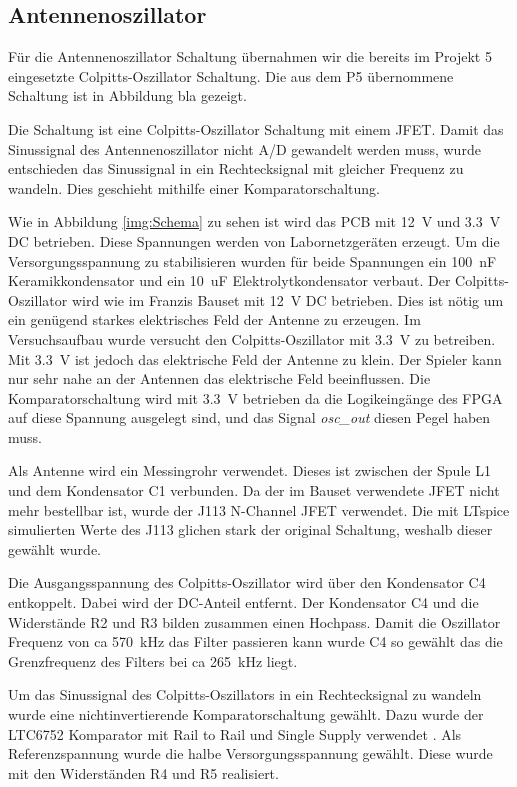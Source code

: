\subsection{Antennenoszillator}\label{subsec:Antennenoszilator}
Für die Antennenoszillator Schaltung übernahmen wir die bereits im Projekt 5 eingesetzte Colpitts-Oszillator Schaltung. Die aus dem P5 übernommene Schaltung ist in Abbildung bla  gezeigt. 

Die Schaltung ist eine Colpitts-Oszillator Schaltung mit einem JFET. 
Damit das Sinussignal des Antennenoszillator nicht A/D gewandelt werden muss, wurde entschieden das Sinussignal in ein Rechtecksignal mit gleicher Frequenz zu wandeln. Dies geschieht mithilfe einer Komparatorschaltung. 

Wie in Abbildung \ref{img:Schema} zu sehen ist wird das PCB mit \SI{12}{V} und \SI{3.3}{V} DC betrieben. Diese Spannungen werden von Labornetzgeräten erzeugt. Um die Versorgungsspannung zu stabilisieren wurden für beide Spannungen ein  \SI{100}{nF} Keramikkondensator und ein \SI{10}{uF} Elektrolytkondensator verbaut. 
Der Colpitts-Oszillator wird wie im Franzis Bauset mit \SI{12}{V} DC betrieben. Dies ist nötig um ein genügend starkes elektrisches Feld der Antenne zu erzeugen. Im Versuchsaufbau wurde versucht den Colpitts-Oszillator mit \SI{3.3}{V} zu betreiben. Mit \SI{3.3}{V} ist jedoch das elektrische Feld der Antenne zu klein. Der Spieler kann nur sehr nahe an der Antennen das elektrische Feld beeinflussen.
Die Komparatorschaltung wird mit \SI{3.3}{V} betrieben da die Logikeingänge des FPGA auf diese Spannung ausgelegt sind, und das Signal \textit{osc\_out} diesen Pegel haben muss.

Als Antenne wird ein Messingrohr verwendet. Dieses ist zwischen der Spule L1 und dem Kondensator C1 verbunden. 
Da der im Bauset verwendete JFET nicht mehr bestellbar ist, wurde der J113 N-Channel JFET verwendet. Die mit LTspice simulierten Werte des J113 glichen stark der original Schaltung, weshalb dieser gewählt wurde. 



\clearpage

Die Ausgangsspannung des Colpitts-Oszillator wird über den Kondensator C4 entkoppelt. Dabei wird der DC-Anteil entfernt. Der Kondensator C4 und die Widerstände R2 und R3 bilden zusammen einen Hochpass. Damit die Oszillator Frequenz von ca \SI{570}{kHz} das Filter passieren kann wurde C4 so gewählt das die Grenzfrequenz des Filters bei ca \SI{265}{kHz} liegt. 

Um das Sinussignal des Colpitts-Oszillators in ein Rechtecksignal zu wandeln wurde eine nichtinvertierende Komparatorschaltung gewählt. Dazu wurde der LTC6752 Komparator mit Rail to Rail und Single Supply verwendet \cite{LTC}. Als Referenzspannung wurde die halbe Versorgungsspannung gewählt. Diese wurde mit den Widerständen R4 und R5 realisiert.


